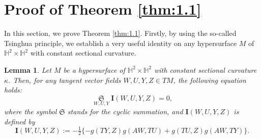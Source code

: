 \documentclass[reqno]{amsart}%
\newtheorem{lemma}[theorem]{Lemma}
\theoremstyle{definition}
\numberwithin{equation}{section}
\begin{document}
\section{Proof of Theorem \ref{thm:1.1}}\label{sect:5}
%
In this section, we prove Theorem \ref{thm:1.1}.
Firstly, by using the so-called Tsinghua principle, we establish a very useful identity
on any hypersurface $M$ of $\mathbb{H}^2\times\mathbb{H}^2$ with constant sectional curvature.


\begin{lemma}\label{lemma:3.2aa}
Let $M$ be a hypersurface of $\mathbb{H}^2\times \mathbb{H}^2$ with constant sectional curvature $\kappa$.
Then, for any tangent vector fields $W,U,Y,Z\in TM$, the following equation holds:
%
\begin{equation}\label{eqn:3.1}
\mathop\mathfrak{S}\limits_{W,U,Y}\mathbf{I}(W,U,Y,Z)=0,
\end{equation}
where the symbol $\mathfrak{S}$ stands for the cyclic summation,
and $\mathbf{I}(W,U,Y,Z)$ is defined by
\begin{equation*}
\mathbf{I}(W,U,Y,Z):=-\tfrac{1}{2}\{-g(TY,Z)g(AW,TU)+g(TU,Z)g(AW,TY)\}.
\end{equation*}
\end{lemma}
%
\end{document}
